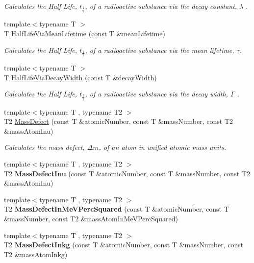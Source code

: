 \begin{DoxyCompactItemize}
\begin{DoxyCompactList}\small\item\em Calculates the Half Life, $t_{\frac{1}{2}}$, of a radioactive substance via the decay constant, $\lambda$ . \end{DoxyCompactList}\item 
{\footnotesize template$<$typename T $>$ }\\T \hyperlink{group___half_life_gacddef16b62e98b214ec8dd8af7da7dce}{Half\+Life\+Via\+Mean\+Lifetime} (const T \&mean\+Lifetime)
\begin{DoxyCompactList}\small\item\em Calculates the Half Life, $t_{\frac{1}{2}}$, of a radioactive substance via the mean lifetime, $\tau$. \end{DoxyCompactList}\item 
{\footnotesize template$<$typename T $>$ }\\T \hyperlink{group___half_life_gaba3fda944d1a68ee1016a1f2f5809359}{Half\+Life\+Via\+Decay\+Width} (const T \&decay\+Width)
\begin{DoxyCompactList}\small\item\em Calculates the Half Life, $t_{\frac{1}{2}}$, of a radioactive substance via the decay width, $\Gamma$ . \end{DoxyCompactList}\item 
{\footnotesize template$<$typename T , typename T2 $>$ }\\T2 \hyperlink{group___mass_defect_gae89f2dfa65992c0314adc2440b2f582a}{Mass\+Defect} (const T \&atomic\+Number, const T \&mass\+Number, const T2 \&mass\+Atom\+Inu)
\begin{DoxyCompactList}\small\item\em Calculates the mass defect, $\Delta m$, of an atom in unified atomic mass units. \end{DoxyCompactList}\item 
{\footnotesize template$<$typename T , typename T2 $>$ }\\T2 {\bfseries Mass\+Defect\+Inu} (const T \&atomic\+Number, const T \&mass\+Number, const T2 \&mass\+Atom\+Inu)
\item 
{\footnotesize template$<$typename T , typename T2 $>$ }\\T2 {\bfseries Mass\+Defect\+In\+Me\+V\+Perc\+Squared} (const T \&atomic\+Number, const T \&mass\+Number, const T2 \&mass\+Atom\+In\+Me\+V\+Perc\+Squared)
\item 
{\footnotesize template$<$typename T , typename T2 $>$ }\\T2 {\bfseries Mass\+Defect\+Inkg} (const T \&atomic\+Number, const T \&mass\+Number, const T2 \&mass\+Atom\+Inkg)

\end{DoxyCompactItemize}
